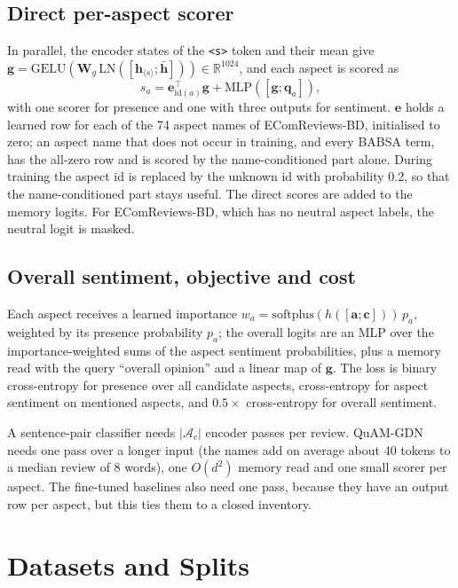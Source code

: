 \documentclass[11pt]{article}
\newcommand{\quam}{QuAM-GDN}
\begin{document}
\subsection{Direct per-aspect scorer}
In parallel, the encoder states of the \texttt{<s>} token and their mean give
$\mathbf{g}=\mathrm{GELU}(\mathbf{W}_g\,\mathrm{LN}([\mathbf{h}_{\langle s\rangle};\bar{\mathbf{h}}]))\in\mathbb{R}^{1024}$,
and each aspect is scored as
\begin{equation}
s_a = \mathbf{e}_{\mathrm{id}(a)}^\top\mathbf{g} + \mathrm{MLP}([\mathbf{g};\mathbf{q}_a]),
\label{eq:direct}
\end{equation}
with one scorer for presence and one with three outputs for sentiment. $\mathbf{e}$ holds a learned
row for each of the 74 aspect names of EComReviews-BD, initialised to zero; an aspect name that does
not occur in training, and every BABSA term, has the all-zero row and is scored by the name-conditioned
part alone. During training the aspect id is replaced by the unknown id with probability 0.2, so that
the name-conditioned part stays useful. The direct scores are added to the memory logits. For
EComReviews-BD, which has no neutral aspect labels, the neutral logit is masked.

\subsection{Overall sentiment, objective and cost}
Each aspect receives a learned importance $w_a=\mathrm{softplus}(h([\mathbf{a};\mathbf{c}]))\,p_a$,
weighted by its presence probability $p_a$; the overall logits are an MLP over the importance-weighted
sums of the aspect sentiment probabilities, plus a memory read with the query ``overall opinion'' and a
linear map of $\mathbf{g}$. The loss is binary cross-entropy for presence over all candidate aspects,
cross-entropy for aspect sentiment on mentioned aspects, and $0.5\times$ cross-entropy for overall
sentiment.

A sentence-pair classifier \citep{sun2019auxiliary} needs $|\mathcal{A}_c|$ encoder passes per
review. \quam{} needs one pass over a longer input (the names add on average about 40 tokens to a
median review of 8 words), one $O(d^2)$ memory read and one small scorer per aspect. The fine-tuned
baselines also need one pass, because they have an output row per aspect, but this ties them to a
closed inventory.

\section{Datasets and Splits}
\label{sec:data}
\end{document}
